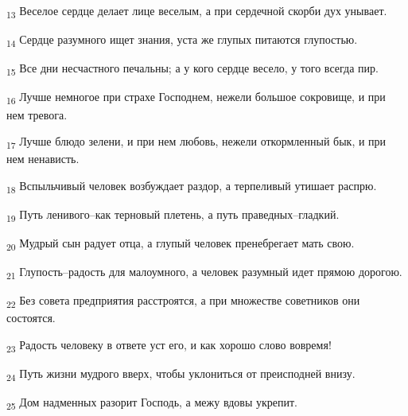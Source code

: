 \begin{tcolorbox}
\textsubscript{13} Веселое сердце делает лице веселым, а при сердечной скорби дух унывает.
\end{tcolorbox}
\begin{tcolorbox}
\textsubscript{14} Сердце разумного ищет знания, уста же глупых питаются глупостью.
\end{tcolorbox}
\begin{tcolorbox}
\textsubscript{15} Все дни несчастного печальны; а у кого сердце весело, у того всегда пир.
\end{tcolorbox}
\begin{tcolorbox}
\textsubscript{16} Лучше немногое при страхе Господнем, нежели большое сокровище, и при нем тревога.
\end{tcolorbox}
\begin{tcolorbox}
\textsubscript{17} Лучше блюдо зелени, и при нем любовь, нежели откормленный бык, и при нем ненависть.
\end{tcolorbox}
\begin{tcolorbox}
\textsubscript{18} Вспыльчивый человек возбуждает раздор, а терпеливый утишает распрю.
\end{tcolorbox}
\begin{tcolorbox}
\textsubscript{19} Путь ленивого--как терновый плетень, а путь праведных--гладкий.
\end{tcolorbox}
\begin{tcolorbox}
\textsubscript{20} Мудрый сын радует отца, а глупый человек пренебрегает мать свою.
\end{tcolorbox}
\begin{tcolorbox}
\textsubscript{21} Глупость--радость для малоумного, а человек разумный идет прямою дорогою.
\end{tcolorbox}
\begin{tcolorbox}
\textsubscript{22} Без совета предприятия расстроятся, а при множестве советников они состоятся.
\end{tcolorbox}
\begin{tcolorbox}
\textsubscript{23} Радость человеку в ответе уст его, и как хорошо слово вовремя!
\end{tcolorbox}
\begin{tcolorbox}
\textsubscript{24} Путь жизни мудрого вверх, чтобы уклониться от преисподней внизу.
\end{tcolorbox}
\begin{tcolorbox}
\textsubscript{25} Дом надменных разорит Господь, а межу вдовы укрепит.
\end{tcolorbox}
